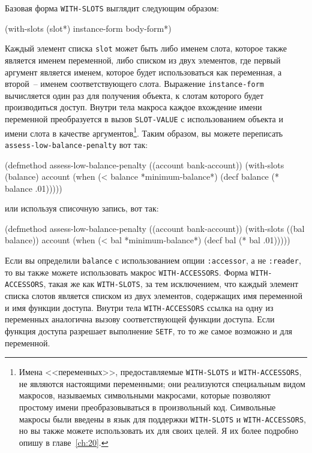 Базовая форма  \lstinline{WITH-SLOTS} выглядит следующим образом:

\begin{myverb}
(with-slots (slot*) instance-form
  body-form*)
\end{myverb}

Каждый элемент списка \lstinline{slot} может быть либо именем слота, которое также является
именем переменной, либо списком из двух элементов, где первый аргумент является именем,
которое будет использоваться как переменная, а второй~-- именем соответствующего слота.
Выражение \lstinline{instance-form} вычисляется один раз для получения объекта, к слотам
которого будет производиться доступ.  Внутри тела макроса каждое вхождение имени
переменной преобразуется в вызов \lstinline{SLOT-VALUE} с использованием объекта и имени слота
в качестве аргументов\footnote{Имена <<переменных>>, предоставляемые \lstinline{WITH-SLOTS} и
  \lstinline{WITH-ACCESSORS}, не являются настоящими переменными; они реализуются специальным
  видом макросов, называемых символьными макросами, которые позволяют простому имени
  преобразовываться в произвольный код.  Символьные макросы были введены в язык для
  поддержки \lstinline{WITH-SLOTS} и \lstinline{WITH-ACCESSORS}, но вы также можете использовать их
  для своих целей.  Я их более подробно опишу в главе~\ref{ch:20}.}.  Таким образом, вы можете
  переписать \lstinline{assess-low-balance-penalty} вот так:

\begin{myverb}
(defmethod assess-low-balance-penalty ((account bank-account))
  (with-slots (balance) account
    (when (< balance *minimum-balance*)
      (decf balance (* balance .01)))))
\end{myverb}

\noindent{}или используя списочную запись, вот так:

\begin{myverb}
(defmethod assess-low-balance-penalty ((account bank-account))
  (with-slots ((bal balance)) account
    (when (< bal *minimum-balance*)
      (decf bal (* bal .01)))))
\end{myverb}

Если вы определили \lstinline{balance} с использованием опции \lstinline{:accessor}, а не
\lstinline{:reader}, то вы также можете использовать макрос \lstinline{WITH-ACCESSORS}.  Форма
\lstinline{WITH-ACCESSORS}, такая же как \lstinline{WITH-SLOTS}, за тем исключением, что каждый
элемент списка слотов является списком из двух элементов, содержащих имя переменной и имя
функции доступа.  Внутри тела \lstinline{WITH-ACCESSORS} ссылка на одну из переменных
аналогична вызову соответствующей функции доступа.  Если функция доступа разрешает
выполнение \lstinline{SETF}, то то же самое возможно и для переменной.


